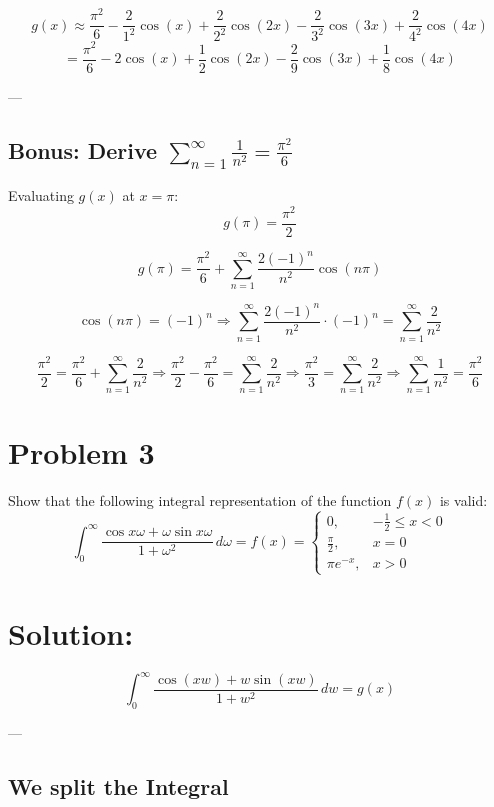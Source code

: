 \documentclass{article}
\begin{document}
\[
g(x) \approx \frac{\pi^2}{6} - \frac{2}{1^2} \cos(x) + \frac{2}{2^2} \cos(2x) - \frac{2}{3^2} \cos(3x) + \frac{2}{4^2} \cos(4x)
\]
\[
= \frac{\pi^2}{6} - 2 \cos(x) + \frac{1}{2} \cos(2x) - \frac{2}{9} \cos(3x) + \frac{1}{8} \cos(4x)
\]

---

\subsection*{Bonus: Derive \( \sum_{n=1}^{\infty} \frac{1}{n^2} = \frac{\pi^2}{6} \)}
Evaluating \( g(x) \) at \( x = \pi \):
\[
g(\pi) = \frac{\pi^2}{2}
\]

\[
g(\pi) = \frac{\pi^2}{6} + \sum_{n=1}^{\infty} \frac{2(-1)^n}{n^2} \cos(n\pi)
\]

\[
\cos(n\pi) = (-1)^n \Rightarrow \sum_{n=1}^{\infty} \frac{2(-1)^n}{n^2} \cdot (-1)^n = \sum_{n=1}^{\infty} \frac{2}{n^2}
\]

\[
\frac{\pi^2}{2} = \frac{\pi^2}{6} + \sum_{n=1}^{\infty} \frac{2}{n^2}
\Rightarrow \frac{\pi^2}{2} - \frac{\pi^2}{6} = \sum_{n=1}^{\infty} \frac{2}{n^2}
\Rightarrow \frac{\pi^2}{3} = \sum_{n=1}^{\infty} \frac{2}{n^2}
\Rightarrow \sum_{n=1}^{\infty} \frac{1}{n^2} = \boxed{ \frac{\pi^2}{6} }
\]


\newpage
\section*{Problem 3}

\noindent
Show that the following integral representation of the function \( f(x) \) is valid:
\[
\int_0^{\infty} \frac{\cos x\omega + \omega \sin x\omega}{1 + \omega^2} \, d\omega = f(x) =
\begin{cases}
0, & -\frac{1}{2} \le x < 0 \\[6pt]
\frac{\pi}{2}, & x = 0 \\[6pt]
\pi e^{-x}, & x > 0
\end{cases}
\]

\section*{Solution:}

\[
\int_0^\infty \frac{\cos(xw) + w \sin(xw)}{1 + w^2} \, dw = g(x)
\]

---

\subsection*{We split the Integral}
\end{document}
